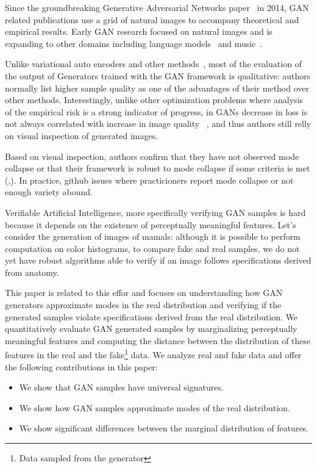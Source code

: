 Since the groundbreaking Generative Adversarial Networks
paper~\cite{goodfellow2014generative} in 2014, GAN related
publications use a grid of natural images to accompany theoretical and empirical
results. Early GAN research focused on natural images and is expanding to other 
domains including language models~\cite{gulrajani2017improved} and
music~\cite{yang2017midigan}.  

Unlike variational auto encoders and other
methods~\cite{goodfellow2014generative}, most of the evaluation of the output
of Generators trained with the GAN framework is qualitative: authors normally 
list higher sample quality as one of the advantages of their method over other
methods.  Interestingly, unlike other optimization problems where analysis of
the empirical risk is a strong indicator of progress, in GANs decrease in loss 
is not always correlated with increase in image quality 
~\cite{arjovsky2017wasserstein}, and thus authors still relly on visual 
inspection of generated images.

Based on visual inspection, authors confirm that they have not observed
mode collapse or that their framework is robust to mode collapse if some
criteria is met (\cite{arjovsky2017wasserstein},\cite{gulrajani2017improved}). 
In practice, github issues where practicioners report mode collapse or
not enough variety abound.

Verifiable Artificial Intelligence\cite{seshia2016vai}, more specifically
verifying GAN samples is hard because it depends on the existence of
perceptually meaningful features. Let's consider the generation of images
of mamals: although it is possible to perform computation on color histograms,
to compare fake and real samples, we do not yet have robust algorithms
able to verify if an image follows specifications derived from anatomy. 

This paper is related to this effor and focuses on understanding how GAN
generators approximate modes in the real distribution and verifying if the
generated samples violate specifications derived from the real distribution. We
quantitatively evaluate GAN generated samples by marginalizing perceptually
meaningful features and computing the distance between the distribution of these 
features in the real and the fake\footnote{Data sampled from the generator} data.  
We analyze real and fake data and offer the following contributions in this paper: 
\begin{itemize}
\item We show that GAN samples have universal signatures.
\item We show how GAN samples approximate modes of the real distribution.
\item We show significant differences between the marginal distribution of features. 
\end{itemize}

